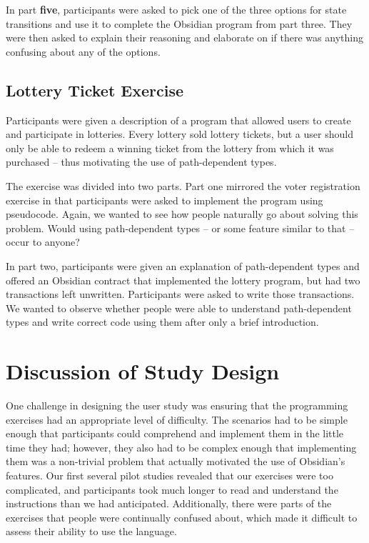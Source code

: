 \documentclass[sigplan,10pt,review]{acmart}\settopmatter{printfolios=true}
\begin{document}
In part \textbf{five}, participants were asked to pick one of the three options for state transitions and use it to complete 
the Obsidian program from part three. They were then asked to explain their reasoning and elaborate on if 
there was anything confusing about any of the options. 

\subsection{Lottery Ticket Exercise}
	
Participants were given a description of a program that allowed users to create and participate in lotteries. Every 
lottery sold lottery tickets, but a user should only be able to redeem a winning ticket from the lottery from which it was purchased
 -- thus motivating the use of path-dependent types. 

The exercise was divided into two parts. Part one mirrored the voter registration exercise in that participants were 
asked to implement the program using pseudocode. Again, we wanted to see how people naturally go about 
solving this problem. Would using path-dependent types -- or some feature similar to that -- occur to anyone?
	
In part two, participants were given an explanation of path-dependent types and offered an Obsidian contract that 
implemented the lottery program, but had two transactions left unwritten. Participants were asked to write 
those transactions. We wanted to observe whether people were able to understand path-dependent types and write 
correct code using them after only a brief introduction. 

\section{Discussion of Study Design}

One challenge in designing the user study was ensuring that the programming exercises had an appropriate level of difficulty. The 
scenarios had to be simple enough that participants could comprehend and implement them in the little time they had; however, 
they also had to be complex enough that implementing them was a non-trivial problem that actually motivated the use of 
Obsidian's features. Our first several pilot studies revealed that our exercises were too complicated, and 
participants took much longer to read and understand the instructions than we had anticipated. Additionally, there were parts 
of the exercises that people were continually confused about, which made it difficult to assess their ability to use the language. 
\end{document}
